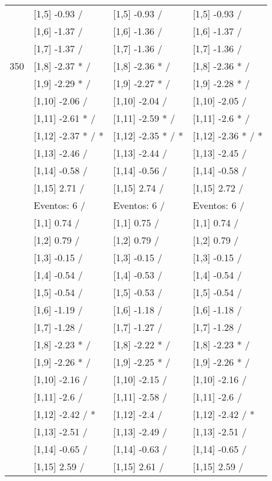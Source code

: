 \begin{table}
\begin{tabular}[t]{llll}
 & {}[1,5] -0.93  / & {}[1,5] -0.93  / & {}[1,5] -0.93  /\\
 & {}[1,6] -1.37  / & {}[1,6] -1.36  / & {}[1,6] -1.37  /\\
 & {}[1,7] -1.37  / & {}[1,7] -1.36  / & {}[1,7] -1.36  /\\
350 & {}[1,8] -2.37 * / & {}[1,8] -2.36 * / & {}[1,8] -2.36 * /\\
\addlinespace
 & {}[1,9] -2.29 * / & {}[1,9] -2.27 * / & {}[1,9] -2.28 * /\\
 & {}[1,10] -2.06  / & {}[1,10] -2.04  / & {}[1,10] -2.05  /\\
 & {}[1,11] -2.61 * / & {}[1,11] -2.59 * / & {}[1,11] -2.6 * /\\
 & {}[1,12] -2.37 * / * & {}[1,12] -2.35 * / * & {}[1,12] -2.36 * / *\\
 & {}[1,13] -2.46  / & {}[1,13] -2.44  / & {}[1,13] -2.45  /\\
\addlinespace
 & {}[1,14] -0.58  / & {}[1,14] -0.56  / & {}[1,14] -0.58  /\\
 & {}[1,15] 2.71  / & {}[1,15] 2.74  / & {}[1,15] 2.72  /\\
 & Eventos:  6 / & Eventos:  6 / & Eventos:  6 /\\
 & {}[1,1] 0.74  / & {}[1,1] 0.75  / & {}[1,1] 0.74  /\\
 & {}[1,2] 0.79  / & {}[1,2] 0.79  / & {}[1,2] 0.79  /\\
\addlinespace
 & {}[1,3] -0.15  / & {}[1,3] -0.15  / & {}[1,3] -0.15  /\\
 & {}[1,4] -0.54  / & {}[1,4] -0.53  / & {}[1,4] -0.54  /\\
 & {}[1,5] -0.54  / & {}[1,5] -0.53  / & {}[1,5] -0.54  /\\
 & {}[1,6] -1.19  / & {}[1,6] -1.18  / & {}[1,6] -1.18  /\\
 & {}[1,7] -1.28  / & {}[1,7] -1.27  / & {}[1,7] -1.28  /\\
\addlinespace
500 & {}[1,8] -2.23 * / & {}[1,8] -2.22 * / & {}[1,8] -2.23 * /\\
 & {}[1,9] -2.26 * / & {}[1,9] -2.25 * / & {}[1,9] -2.26 * /\\
 & {}[1,10] -2.16  / & {}[1,10] -2.15  / & {}[1,10] -2.16  /\\
 & {}[1,11] -2.6  / & {}[1,11] -2.58  / & {}[1,11] -2.6  /\\
 & {}[1,12] -2.42  / * & {}[1,12] -2.4  / & {}[1,12] -2.42  / *\\
\addlinespace
 & {}[1,13] -2.51  / & {}[1,13] -2.49  / & {}[1,13] -2.51  /\\
 & {}[1,14] -0.65  / & {}[1,14] -0.63  / & {}[1,14] -0.65  /\\
 & {}[1,15] 2.59  / & {}[1,15] 2.61  / & {}[1,15] 2.59  /\\
\bottomrule
\end{tabular}
\end{table}
